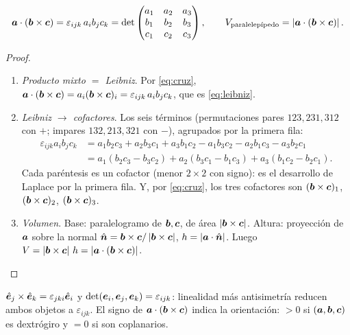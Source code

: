 \begin{corolario}
\label{cor:mixto}
\begin{equation}
  \bm{a}\cdot(\bm{b}\times\bm{c})=\varepsilon_{ijk}\,a_{i}b_{j}c_{k}
  =\det\begin{pmatrix}a_{1}&a_{2}&a_{3}\\ b_{1}&b_{2}&b_{3}\\ c_{1}&c_{2}&c_{3}\end{pmatrix},
  \qquad
  V_{\text{paralelepípedo}}=\left\lvert \bm{a}\cdot(\bm{b}\times\bm{c})\right\rvert.
  \label{eq:mixto}
\end{equation}
\end{corolario}

\begin{proof}
\begin{enumerate}
  \item \emph{Producto mixto $=$ Leibniz}. Por \eqref{eq:cruz},
  $\bm{a}\cdot(\bm{b}\times\bm{c})=a_{i}(\bm{b}\times\bm{c})_{i}=\varepsilon_{ijk}\,a_{i}b_{j}c_{k}$,
  que es \eqref{eq:leibniz}.
  \item \emph{Leibniz $\to$ cofactores}. Los seis términos (permutaciones
  pares $123,231,312$ con $+$; impares $132,213,321$ con $-$), agrupados por
  la primera fila:
  \begin{align*}
    \varepsilon_{ijk}a_{i}b_{j}c_{k}
    &=a_{1}b_{2}c_{3}+a_{2}b_{3}c_{1}+a_{3}b_{1}c_{2}-a_{1}b_{3}c_{2}-a_{2}b_{1}c_{3}-a_{3}b_{2}c_{1}\\
    &=a_{1}(b_{2}c_{3}-b_{3}c_{2})+a_{2}(b_{3}c_{1}-b_{1}c_{3})+a_{3}(b_{1}c_{2}-b_{2}c_{1}).
  \end{align*}
  Cada paréntesis es un cofactor (menor $2\times2$ con signo): es el desarrollo
  de Laplace por la primera fila. Y, por \eqref{eq:cruz}, los tres cofactores
  son $(\bm{b}\times\bm{c})_{1}$, $(\bm{b}\times\bm{c})_{2}$, $(\bm{b}\times\bm{c})_{3}$.
  \item \emph{Volumen}. Base: paralelogramo de $\bm{b},\bm{c}$, de área
  $\left\lvert \bm{b}\times\bm{c}\right\rvert$. Altura: proyección de $\bm{a}$ sobre la normal
  $\hat{\bm{n}}=\bm{b}\times\bm{c}/\left\lvert \bm{b}\times\bm{c}\right\rvert$, $h=\left\lvert \bm{a}\cdot\hat{\bm{n}}\right\rvert$. Luego
  $V=\left\lvert \bm{b}\times\bm{c}\right\rvert\,h=\left\lvert \bm{a}\cdot(\bm{b}\times\bm{c})\right\rvert$.\qedhere
\end{enumerate}
\end{proof}

\begin{observacion}
$\hat{\bm{e}}_{j}\times\hat{\bm{e}}_{k}=\varepsilon_{jki}\hat{\bm{e}}_{i}$ y
$\det(\bm{e}_{i},\bm{e}_{j},\bm{e}_{k})=\varepsilon_{ijk}$: linealidad más
antisimetría reducen ambos objetos a $\varepsilon_{ijk}$. El signo de
$\bm{a}\cdot(\bm{b}\times\bm{c})$ indica la orientación: $>0$ si
$(\bm{a},\bm{b},\bm{c})$ es dextrógiro y $=0$ si son coplanarios.
\end{observacion}

